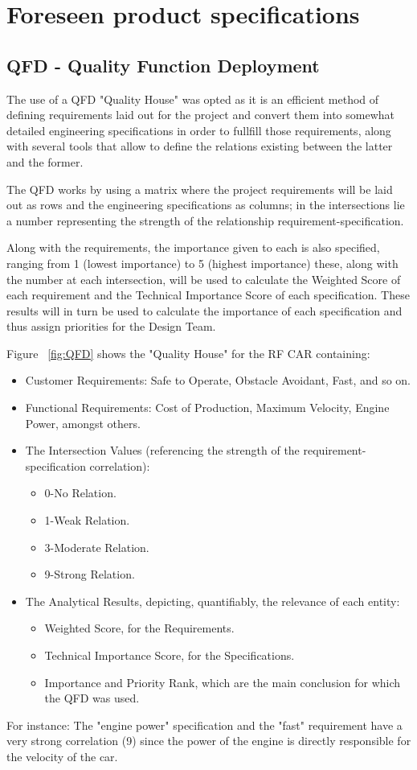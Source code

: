 \section{Foreseen product specifications}
\label{sec:org31f7574}
\subsection{QFD - Quality Function Deployment}

The use of a QFD "Quality House" was opted as it is an efficient method of defining requirements laid out for the project and convert them into somewhat detailed engineering specifications in order to fullfill those requirements, along with several tools that allow to define the relations existing between the latter and the former.

The QFD works by using a matrix where the project requirements will be laid out as rows and the engineering specifications as columns; in the intersections lie a number representing the strength of the relationship requirement-specification.

Along with the requirements, the importance given to each is also specified, ranging from 1 (lowest importance) to 5 (highest importance) these, along with the number at each intersection, will be used to calculate the Weighted Score of each requirement and the Technical Importance Score of each specification. These results will in turn be used to calculate the importance of each specification and thus assign priorities for the Design Team.

Figure ~\ref{fig:QFD} shows the "Quality House" for the RF CAR containing:
\begin{itemize}
\item Customer Requirements: Safe to Operate, Obstacle Avoidant, Fast, and so on.
\item Functional Requirements: Cost of Production, Maximum Velocity, Engine Power, amongst others.
\item The Intersection Values (referencing the strength of the requirement-specification correlation): 
\begin{itemize}
\item 0-No Relation.
\item 1-Weak Relation.
\item 3-Moderate Relation.
\item 9-Strong Relation.
\end{itemize}
\item The Analytical Results, depicting, quantifiably, the relevance of each entity:
\begin{itemize}
\item Weighted Score, for the Requirements.
\item Technical Importance Score, for the Specifications.
\item Importance and Priority Rank, which are the main conclusion for which the QFD was used.  
\end{itemize}
\end{itemize}
For instance: The "engine power" specification and the "fast" requirement have a very strong correlation (9) since the power of the engine is directly responsible for the velocity of the car. 

